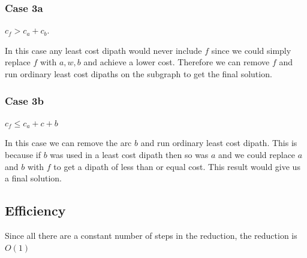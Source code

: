 \documentclass{article}
\begin{document}
\subsubsection*{Case 3a}
$c_f > c_a + c_b$. 

In this case any least cost dipath would never include $f$ since we could simply replace $f$ with $a, w, b$ and
achieve a lower cost. Therefore we can remove $f$ and run ordinary least cost dipaths on the subgraph to get the final solution.



\subsubsection*{Case 3b}
$c_f \leq c_a + c+b$

In this case we can remove the arc $b$ and run ordinary least cost dipath. This is because if $b$ was used in a least cost dipath then so was $a$ and we could replace $a$ and $b$ with $f$ to get a dipath of less than or equal cost. This result would give us a final solution.

\subsection*{Efficiency}
Since all there are a constant number of steps in the reduction, the reduction is $O(1)$
\end{document}
